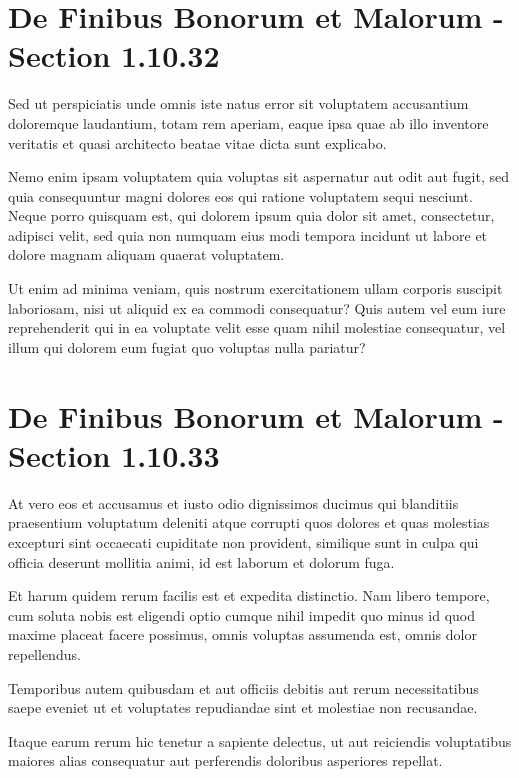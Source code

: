 \section{De Finibus Bonorum et Malorum - Section 1.10.32}

Sed ut perspiciatis unde omnis iste natus error sit voluptatem accusantium doloremque laudantium, totam rem aperiam, eaque ipsa quae ab illo inventore veritatis et quasi architecto beatae vitae dicta sunt explicabo.  

Nemo enim ipsam voluptatem quia voluptas sit aspernatur aut odit aut fugit, sed quia consequuntur magni dolores eos qui ratione voluptatem sequi nesciunt. Neque porro quisquam est, qui dolorem ipsum quia dolor sit amet, consectetur, adipisci velit, sed quia non numquam eius modi tempora incidunt ut labore et dolore magnam aliquam quaerat voluptatem.  

Ut enim ad minima veniam, quis nostrum exercitationem ullam corporis suscipit laboriosam, nisi ut aliquid ex ea commodi consequatur?  
Quis autem vel eum iure reprehenderit qui in ea voluptate velit esse quam nihil molestiae consequatur, vel illum qui dolorem eum fugiat quo voluptas nulla pariatur?

\section{De Finibus Bonorum et Malorum - Section 1.10.33}

At vero eos et accusamus et iusto odio dignissimos ducimus qui blanditiis praesentium voluptatum deleniti atque corrupti quos dolores et quas molestias excepturi sint occaecati cupiditate non provident, similique sunt in culpa qui officia deserunt mollitia animi, id est laborum et dolorum fuga.  

Et harum quidem rerum facilis est et expedita distinctio. Nam libero tempore, cum soluta nobis est eligendi optio cumque nihil impedit quo minus id quod maxime placeat facere possimus, omnis voluptas assumenda est, omnis dolor repellendus.  

Temporibus autem quibusdam et aut officiis debitis aut rerum necessitatibus saepe eveniet ut et voluptates repudiandae sint et molestiae non recusandae.  

Itaque earum rerum hic tenetur a sapiente delectus, ut aut reiciendis voluptatibus maiores alias consequatur aut perferendis doloribus asperiores repellat.
